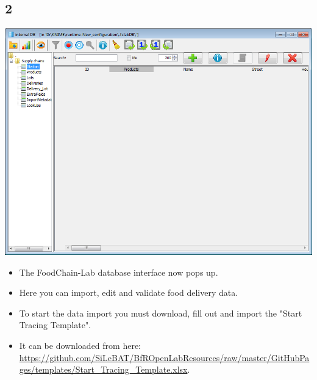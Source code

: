 \documentclass{beamer}
\begin{document}
\subsection{2}
\begin{frame}
	\begin{center}
  		\includegraphics[height=0.5\textheight]{2.png}
	\end{center}
	\begin{itemize}
		\item The FoodChain-Lab database interface now pops up.
		\item Here you can import, edit and validate food delivery data.
		\item To start the data import you must download, fill out and import the "Start Tracing Template".
		\item It can be downloaded from here: \url{https://github.com/SiLeBAT/BfROpenLabResources/raw/master/GitHubPages/templates/Start_Tracing_Template.xlsx}.
	\end{itemize}
\end{frame}
\end{document}
